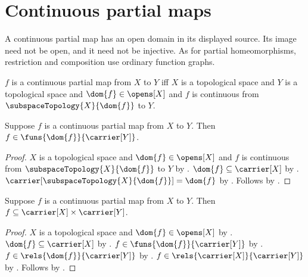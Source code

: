 \section{Continuous partial maps}




A continuous partial map has an open domain in its displayed source. Its
image need not be open, and it need not be injective. As for partial
homeomorphisms, restriction and composition use ordinary function graphs.

\begin{definition}\label{continuous_partial_map}
    $f$ is a continuous partial map from $X$ to $Y$ iff
        $X$ is a topological space and $Y$ is a topological space and
        $\dom{f}\in\opens[X]$ and
        $f$ is continuous from $\subspaceTopology{X}{\dom{f}}$ to $Y$.
\end{definition}

\begin{proposition}\label{continuous_partial_map_type}
    Suppose $f$ is a continuous partial map from $X$ to $Y$.
    Then $f\in\funs{\dom{f}}{\carrier[Y]}$.
\end{proposition}
\begin{proof}
    $X$ is a topological space and $\dom{f}\in\opens[X]$ and
        $f$ is continuous from $\subspaceTopology{X}{\dom{f}}$ to $Y$ by
        .
    $\dom{f}\subseteq\carrier[X]$ by .
    $\carrier[\subspaceTopology{X}{\dom{f}}]=\dom{f}$ by
        .
    Follows by .
\end{proof}

\begin{proposition}\label{continuous_partial_map_graph_bound}
    Suppose $f$ is a continuous partial map from $X$ to $Y$.
    Then $f\subseteq\carrier[X]\times\carrier[Y]$.
\end{proposition}
\begin{proof}
    $X$ is a topological space and $\dom{f}\in\opens[X]$ by
        .
    $\dom{f}\subseteq\carrier[X]$ by .
    $f\in\funs{\dom{f}}{\carrier[Y]}$ by .
    $f\in\rels{\dom{f}}{\carrier[Y]}$ by .
    $f\in\rels{\carrier[X]}{\carrier[Y]}$ by .
    Follows by .
\end{proof}

